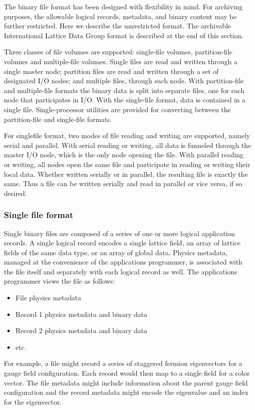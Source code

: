 \documentclass{article}
\begin{document}
The binary file format has been designed with flexibility in mind. For
archiving purposes, the allowable logical records, metadata, and
binary content may be further restricted.  Here we describe the
unrestricted format.  The archivable International Lattice Data Group
format is described at the end of this section.

Three classes of file volumes are supported: single-file volumes,
partition-file volumes and multiple-file volumes.  Single files are
read and written through a single master node; partition files are
read and written through a set of designated I/O nodes; and multiple
files, through each node.  With partition-file and multiple-file
formats the binary data is split into separate files, one for each
node that participates in I/O.  With the single-file format, data is
contained in a single file.  Single-processor utilities are provided
for converting between the partition-file and single-file formats.

For singlefile format, two modes of file reading and writing are
supported, namely serial and parallel.  With serial reading or
writing, all data is funneled through the master I/O node, which is
the only node opening the file.  With parallel reading or writing, all
nodes open the same file and participate in reading or writing their
local data.  Whether written serially or in parallel, the resulting
file is exactly the same.  Thus a file can be written serially and
read in parallel or vice versa, if so desired.

\subsubsection{Single file format}

Single binary files are composed of a series of one or more logical
application records.  A single logical record encodes a single lattice
field, an array of lattice fields of the same data type, or an array
of global data.  Physics metadata, managed at the convenience of the
applications programmer, is associated with the file itself and
separately with each logical record as well. The applications
programmer views the file as follows:
%
\begin{itemize}
  \item File physics metadata
  \item Record 1 physics metadata and binary data
  \item Record 2 physics metadata and binary data
  \item etc.
\end{itemize}
%
For example, a file might record a series of staggered fermion
eigenvectors for a gauge field configuration.  Each record would then
map to a single field for a color vector.  The file metadata might
include information about the parent gauge field configuration and the
record metadata might encode the eigenvalue and an index for the
eigenvector.
\end{document}
